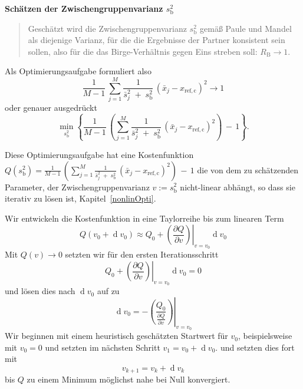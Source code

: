 \textbf{Schätzen der Zwischengruppenvarianz $s^2_\mathrm{b}$}
\begin{quote}
Geschätzt wird die Zwischengruppenvarianz $s^2_\mathrm{b}$ gemäß Paule und Mandel \cite{Pau82} als
diejenige Varianz, für die die Ergebnisse der Partner konsistent sein sollen, also für die
das Birge-Verhältnis gegen Eins streben soll: $R_\mathrm{B} \rightarrow 1$.
\end{quote}
Als Optimierungsaufgabe formuliert also
\begin{equation*}
\frac{1}{M-1} \, \sum\limits_{j=1}^M
\frac{1}{\bar s^2_j \; + \; s^2_\mathrm{b}} \, \left(\bar x_j - x_\mathrm{ref, c}\right)^2 \rightarrow 1
\end{equation*}
oder genauer ausgedrückt
\begin{equation}
\min_{s^2_\mathrm{b}} \left\{\frac{1}{M-1} \, \left( \sum\limits_{j=1}^M
\frac{1}{\bar s^2_j \; + \; s^2_\mathrm{b}} \, \left(\bar x_j - x_\mathrm{ref, c}\right)^2  \right) \, - \, 1\right\}.
\label{eq:x_bet_Bedingung}
\end{equation}

Diese Optimierungsaufgabe hat eine Kostenfunktion 
$Q(s^2_\mathrm{b}) = \frac{1}{M-1} \, \left( \sum\limits_{j=1}^M  
\frac{1}{\bar s^2_j \; + \; s^2_\mathrm{b}} \, \left(\bar x_j - x_\mathrm{ref, c}\right)^2  \right) \, - \, 1$
die von dem zu schätzenden Parameter, der Zwischengruppenvarianz
$v := s^2_\mathrm{b}$ nicht-linear abhängt, so dass sie iterativ zu lösen ist, Kapitel~\ref{nonlinOpti}.

Wir entwickeln die Kostenfunktion in 
eine Taylorreihe bis zum linearen Term
\begin{equation}
Q(v_0 + \operatorname{d} v_0) \approx 
Q_0 + \left.\left( \frac{\partial Q}{\partial v}\right)
\right|_{v=v_0} \operatorname{d} v_0 
\end{equation}
Mit $Q(v) \rightarrow 0$ setzten wir für den ersten
Iterationsschritt
\begin{equation}
Q_0 + \left.\left( \frac{\partial Q}{\partial v}\right)
\right|_{v=v_0} \operatorname{d} v_0 = 0
\end{equation}
und lösen dies nach $\operatorname{d} v_0$ auf zu
\begin{equation}
\operatorname{d} v_0 = -\left. \left( \frac{Q_0}{\frac{\partial Q}{\partial v}}\right) \right| _{v=v_0} 
\end{equation}
Wir beginnen mit einem heuristisch geschätzten Startwert für $v_0$, beispielsweise mit $v_0 = 0$
und setzten im nächsten Schritt $v_1 = v_0 + \operatorname{d} v_0$.
und setzten dies fort mit
\begin{equation}
v_{k+1} =v_k + \operatorname{d} v_k
\end{equation}
bis $Q$ zu einem Minimum möglichst nahe bei Null konvergiert.

